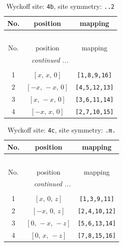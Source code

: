 \documentclass[fleqn,8pt]{jsarticle}
\begin{document}
\begin{longtable}{ccc}
\caption{Wyckoff site: {\tt 4b}, site symmetry: {\tt ..2}}
 \\
 \hline \hline
No. & position & mapping \\ \hline \endfirsthead

\multicolumn{2}{l}{\tablename\ \thetable{}} \\
 \hline \hline
No. & position & mapping \\ \hline \endhead

 \hline \hline
\multicolumn{2}{r}{\footnotesize\it continued ...} \\ \endfoot

 \hline \hline
\multicolumn{2}{r}{} \\ \endlastfoot

1 & $\left[ x,\, x,\, 0 \right]$ & {\tt [1,8,9,16]} \\ \hline
2 & $\left[ - x,\, - x,\, 0 \right]$ & {\tt [4,5,12,13]} \\ \hline
3 & $\left[ x,\, - x,\, 0 \right]$ & {\tt [3,6,11,14]} \\ \hline
4 & $\left[ - x,\, x,\, 0 \right]$ & {\tt [2,7,10,15]} \\
\end{longtable}
\renewcommand{\arraystretch}{1.2}
\begin{longtable}{ccc}
\caption{Wyckoff site: {\tt 4c}, site symmetry: {\tt .m.}}
 \\
 \hline \hline
No. & position & mapping \\ \hline \endfirsthead

\multicolumn{2}{l}{\tablename\ \thetable{}} \\
 \hline \hline
No. & position & mapping \\ \hline \endhead

 \hline \hline
\multicolumn{2}{r}{\footnotesize\it continued ...} \\ \endfoot

 \hline \hline
\multicolumn{2}{r}{} \\ \endlastfoot

1 & $\left[ x,\, 0,\, z \right]$ & {\tt [1,3,9,11]} \\ \hline
2 & $\left[ - x,\, 0,\, z \right]$ & {\tt [2,4,10,12]} \\ \hline
3 & $\left[ 0,\, - x,\, - z \right]$ & {\tt [5,6,13,14]} \\ \hline
4 & $\left[ 0,\, x,\, - z \right]$ & {\tt [7,8,15,16]} \\
\end{longtable}
\end{document}
